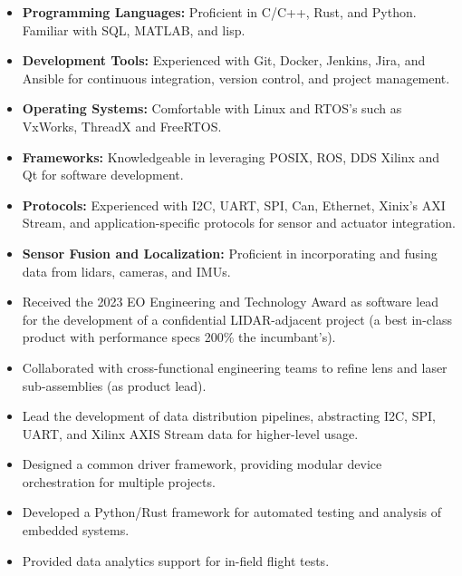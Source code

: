 \documentclass[a4paper,ragged2e,withhyper]{altacv}
\begin{document}
{
\label{sec:orgdad1287}
\begin{itemize}
\item \textbf{Programming Languages:} Proficient in C/C++, Rust, and Python. Familiar with SQL, MATLAB, and lisp.
\item \textbf{Development Tools:} Experienced with Git, Docker, Jenkins, Jira, and Ansible for continuous integration, version control, and project management.
\item \textbf{Operating Systems:} Comfortable with Linux and RTOS's such as VxWorks, ThreadX and FreeRTOS.
\item \textbf{Frameworks:} Knowledgeable in leveraging POSIX, ROS, DDS Xilinx and Qt for software development.
\item \textbf{Protocols:} Experienced with I2C, UART, SPI, Can, Ethernet, Xinix's AXI Stream, and application-specific protocols for sensor and actuator integration.
\item \textbf{Sensor Fusion and Localization:} Proficient in incorporating and fusing data from lidars, cameras, and IMUs.
\end{itemize}
}
\label{sec:org7b8293c}


\begin{itemize}
\item Received the 2023 EO Engineering and Technology Award as software lead for the development of a confidential LIDAR-adjacent project (a best in-class product with performance specs 200\% the incumbant's).
\item Collaborated with cross-functional engineering teams to refine lens and laser sub-assemblies (as product lead).
\item Lead the development of data distribution pipelines, abstracting I2C, SPI, UART, and Xilinx AXIS Stream data for higher-level usage.
\item Designed a common driver framework, providing modular device orchestration for multiple projects.
\item Developed a Python/Rust framework for automated testing and analysis of embedded systems.
\item Provided data analytics support for in-field flight tests.
\end{itemize}
\end{document}
